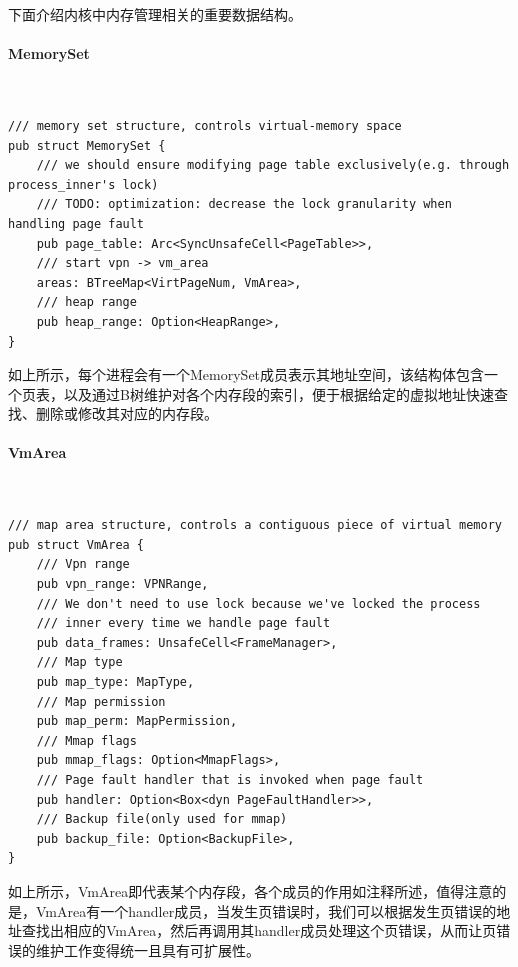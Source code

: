 下面介绍内核中内存管理相关的重要数据结构。

\paragraph{MemorySet}~{}

\begin{tcolorbox}[title=\textbf{os/src/entry.S}]
\begin{verbatim}
/// memory set structure, controls virtual-memory space
pub struct MemorySet {
    /// we should ensure modifying page table exclusively(e.g. through process_inner's lock)
    /// TODO: optimization: decrease the lock granularity when handling page fault
    pub page_table: Arc<SyncUnsafeCell<PageTable>>,
    /// start vpn -> vm_area
    areas: BTreeMap<VirtPageNum, VmArea>,
    /// heap range
    pub heap_range: Option<HeapRange>,
}
\end{verbatim}
\end{tcolorbox}
如上所示，每个进程会有一个MemorySet成员表示其地址空间，该结构体包含一个页表，以及通过B树维护对各个内存段的索引，便于根据给定的虚拟地址快速查找、删除或修改其对应的内存段。

\paragraph{VmArea}~{}

\begin{tcolorbox}[title=\textbf{os/src/entry.S}]
\begin{verbatim}
/// map area structure, controls a contiguous piece of virtual memory
pub struct VmArea {
    /// Vpn range
    pub vpn_range: VPNRange,
    /// We don't need to use lock because we've locked the process
    /// inner every time we handle page fault
    pub data_frames: UnsafeCell<FrameManager>,
    /// Map type
    pub map_type: MapType,
    /// Map permission
    pub map_perm: MapPermission,
    /// Mmap flags
    pub mmap_flags: Option<MmapFlags>,
    /// Page fault handler that is invoked when page fault
    pub handler: Option<Box<dyn PageFaultHandler>>,
    /// Backup file(only used for mmap)
    pub backup_file: Option<BackupFile>,
}
\end{verbatim}
\end{tcolorbox}
如上所示，VmArea即代表某个内存段，各个成员的作用如注释所述，值得注意的是，VmArea有一个handler成员，当发生页错误时，我们可以根据发生页错误的地址查找出相应的VmArea，然后再调用其handler成员处理这个页错误，从而让页错误的维护工作变得统一且具有可扩展性。

